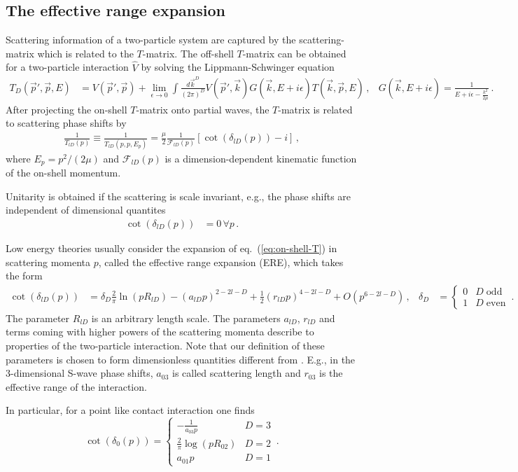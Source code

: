 \subsection{The effective range expansion}
Scattering information of a two-particle system are captured by the scattering-matrix which is related to the $T$-matrix.
The off-shell $T$-matrix can be obtained for a two-particle interaction $\hat V$ by solving the Lippmann-Schwinger equation
\begin{align}
	T_D(\vec p', \vec p, E)
	&=
	V(\vec p', \vec p) + \lim\limits_{\epsilon \to 0}\int \frac{d \vec k^D}{(2\pi)^D} V(\vec p', \vec k) G(\vec k, E + i \epsilon) T(\vec k, \vec p, E) \, ,
	&
	G(\vec k, E+ i \epsilon) = \frac{1}{E + i \epsilon - \frac{k^2}{2\mu}}
	\, .
\end{align}
After projecting the on-shell $T$-matrix onto partial waves,
the $T$-matrix is related to scattering phase shifts by
\begin{align}\label{eq:on-shell-T}
	\frac{1}{T_{lD}(p)}
    \equiv
    \frac{1}{T_{lD}(p, p, E_p)}
    = \frac{\mu}{2}
    \frac{1}{\mathcal F_{l D}(p)} \left[\cot (\delta_{l D}(p)) - i\right] \, ,
\end{align}
where $E_p = p^2 / (2 \mu)$ and $\mathcal F_{l D}(p)$ is a dimension-dependent kinematic function of the on-shell momentum.

Unitarity is obtained if the scattering is scale invariant, e.g., the phase shifts are independent of dimensional quantites
\begin{align}
    \cot (\delta_{l D}(p)) &= 0
    \, \forall p\,.
\end{align}

Low energy theories usually consider the expansion of eq.~(\ref{eq:on-shell-T}) in scattering momenta $p$, called the effective range expansion (ERE), which takes the form \cite{Hammer:2010fw}
\begin{align}
    \cot \left(\delta_{l D}(p)\right)
    &=
    \delta_D \frac{2}{\pi}  \ln \left(p R_{l D}\right)
    -
    (a_{l D}p)^{2 - 2 l - D} +\frac{1}{2} (r_{l D} p)^{4 - 2 l - D} + O\left(p^{6 - 2 l - D}\right)
    \, , &
    \delta_D &= \begin{cases}
        0 & D \;\text{odd} \\ 1 & D \;\text{even}
    \end{cases}
    \, .
\end{align}
The parameter $R_{l D}$ is an arbitrary length scale.
The parameters $a_{l D}$, $r_{l D}$ and terms coming with higher powers of the scattering momenta describe to properties of the two-particle interaction.
Note that our definition of these parameters is chosen to form dimensionless quantities different from \cite{Hammer:2010fw}.
E.g., in the 3-dimensional S-wave phase shifts, $a_{03}$ is called scattering length and $r_{0 3}$ is the effective range of the interaction.

In particular, for a point like contact interaction one finds
\begin{equation}
	\cot \left(\delta_{0}(p)\right)
	=\begin{cases}
		-\frac{1}{a_{03} p} & {D=3} \\ 
		\frac{2}{\pi} \log \left(p R_{02}\right) & {D=2} \\ 
		a_{01}p & {D=1}
	\end{cases}
	\, .
\end{equation}
